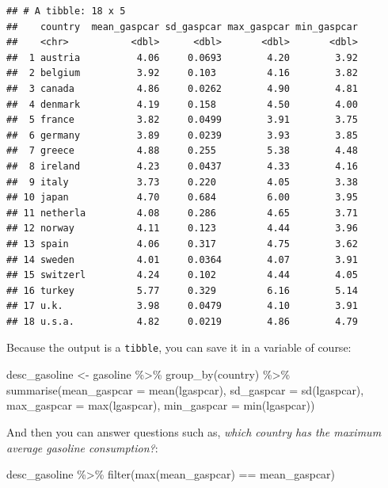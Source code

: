 \documentclass[
]{article}
\newenvironment{Shaded}{\begin{snugshade}}{\end{snugshade}}
\newcommand{\AttributeTok}[1]{\textcolor[rgb]{0.77,0.63,0.00}{#1}}
\newcommand{\FunctionTok}[1]{\textcolor[rgb]{0.00,0.00,0.00}{#1}}
\newcommand{\NormalTok}[1]{#1}
\newcommand{\OtherTok}[1]{\textcolor[rgb]{0.56,0.35,0.01}{#1}}
\newcommand{\SpecialCharTok}[1]{\textcolor[rgb]{0.00,0.00,0.00}{#1}}
\begin{document}
\begin{verbatim}
## # A tibble: 18 x 5
##    country  mean_gaspcar sd_gaspcar max_gaspcar min_gaspcar
##    <chr>           <dbl>      <dbl>       <dbl>       <dbl>
##  1 austria          4.06     0.0693        4.20        3.92
##  2 belgium          3.92     0.103         4.16        3.82
##  3 canada           4.86     0.0262        4.90        4.81
##  4 denmark          4.19     0.158         4.50        4.00
##  5 france           3.82     0.0499        3.91        3.75
##  6 germany          3.89     0.0239        3.93        3.85
##  7 greece           4.88     0.255         5.38        4.48
##  8 ireland          4.23     0.0437        4.33        4.16
##  9 italy            3.73     0.220         4.05        3.38
## 10 japan            4.70     0.684         6.00        3.95
## 11 netherla         4.08     0.286         4.65        3.71
## 12 norway           4.11     0.123         4.44        3.96
## 13 spain            4.06     0.317         4.75        3.62
## 14 sweden           4.01     0.0364        4.07        3.91
## 15 switzerl         4.24     0.102         4.44        4.05
## 16 turkey           5.77     0.329         6.16        5.14
## 17 u.k.             3.98     0.0479        4.10        3.91
## 18 u.s.a.           4.82     0.0219        4.86        4.79
\end{verbatim}

Because the output is a \texttt{tibble}, you can save it in a variable of course:

\begin{Shaded}
\begin{Highlighting}[]
\NormalTok{desc\_gasoline }\OtherTok{\textless{}{-}}\NormalTok{ gasoline }\SpecialCharTok{\%\textgreater{}\%}
  \FunctionTok{group\_by}\NormalTok{(country) }\SpecialCharTok{\%\textgreater{}\%}
  \FunctionTok{summarise}\NormalTok{(}\AttributeTok{mean\_gaspcar =} \FunctionTok{mean}\NormalTok{(lgaspcar),}
            \AttributeTok{sd\_gaspcar =} \FunctionTok{sd}\NormalTok{(lgaspcar),}
            \AttributeTok{max\_gaspcar =} \FunctionTok{max}\NormalTok{(lgaspcar),}
            \AttributeTok{min\_gaspcar =} \FunctionTok{min}\NormalTok{(lgaspcar))}
\end{Highlighting}
\end{Shaded}

And then you can answer questions such as, \emph{which country has the maximum average gasoline
consumption?}:

\begin{Shaded}
\begin{Highlighting}[]
\NormalTok{desc\_gasoline }\SpecialCharTok{\%\textgreater{}\%}
  \FunctionTok{filter}\NormalTok{(}\FunctionTok{max}\NormalTok{(mean\_gaspcar) }\SpecialCharTok{==}\NormalTok{ mean\_gaspcar)}
\end{Highlighting}
\end{Shaded}
\end{document}

